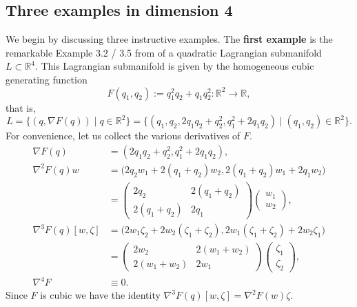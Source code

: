 \documentclass[12pt]{article}
\newcommand{\R}{{\mathbb R}}
\begin{document}
\subsection{Three examples in dimension 4} \label{subsect:3examples}

We begin by discussing three instructive examples. The \textbf{first example} is the remarkable Example 3.2 / 3.5 from \cite{FT2} of a quadratic Lagrangian submanifold $L\subset \R^4$. This Lagrangian submanifold is given by the homogeneous cubic generating function 
\begin{equation}\nonumber
F(q_1,q_2):=q_1^2q_2+q_1q_2^2 : \R^2\to\R,
\end{equation} 
that is,
\begin{equation}\nonumber
L=\{(q,\nabla F(q))\mid q\in\R^2\}=\{(q_1,q_2,2q_1q_2+q_2^2,q_1^2+2q_1q_2)\mid(q_1,q_2)\in\R^2\}.
\end{equation}
For convenience, let us collect the various derivatives of $F$.
\begin{equation}\nonumber
\begin{aligned}
\nabla F(q)&=(2q_1q_2+q_2^2,q_1^2+2q_1q_2),\\[2ex]
\nabla^2 F(q)w&=\big(2q_2w_1+2(q_1+q_2)w_2, 2(q_1+q_2)w_1+2q_1w_2\big)\\
&=
\begin{pmatrix}
2q_2 & 2(q_1+q_2)\\
2(q_1+q_2) & 2q_1 
\end{pmatrix}
\begin{pmatrix}
w_1\\
w_2
\end{pmatrix},\\[2ex]
\nabla^3F(q)[w,\zeta]&=\big(2w_1\zeta_2+2w_2(\zeta_1+\zeta_2), 2w_1(\zeta_1+\zeta_2)+2w_2\zeta_1 \big)\\
&=\begin{pmatrix}
2w_2 & 2(w_1+w_2)\\
2(w_1+w_2) & 2w_1 
\end{pmatrix}
\begin{pmatrix}
\zeta_1\\
\zeta_2
\end{pmatrix},\\[2ex]
\nabla^4 F&\equiv 0.
\end{aligned}
\end{equation}
Since $F$ is cubic we have the identity $\nabla^3F(q)[w,\zeta]=\nabla^2F(w)\zeta$. 
\end{document}
